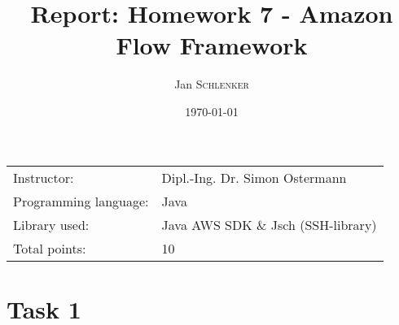 \documentclass{article}
\title{Report: Homework 7 - Amazon Flow Framework}%
\author{Jan \textsc{Schlenker}} %
\date{\today} %
\begin{document}
\maketitle %

\begin{center}
\begin{tabular}{l l}
Instructor: & Dipl.-Ing. Dr. Simon Ostermann \\
Programming language: & Java \\
Library used: & Java AWS SDK \& Jsch (SSH-library) \\
Total points: & 10 \\
\end{tabular}
\end{center}



\section{Task 1}
\end{document}
